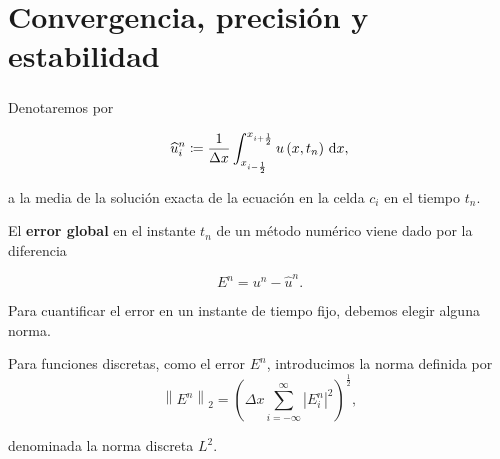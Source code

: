 \section{Convergencia, precisión y estabilidad}

\begin{frame}
    \frametitle{\secname}

    Denotaremos por

    \begin{equation*}
        \widehat{u}^{n}_{i}\coloneqq
        \frac{1}{\Delta x}
        \int_{x_{i-\frac{1}{2}}}^{x_{i+\frac{1}{2}}}
        u\left(x,t_{n}\right)\dl x,
    \end{equation*}

    a la media de la solución exacta de la ecuación en la celda $c_{i}$ en el tiempo $t_{n}$.

    \begin{definition}
        El \textbf{error global} en el instante $t_{n}$ de un método
        numérico viene dado por la diferencia

        \begin{equation*}
            E^{n}=
            u^{n}-
            \widehat{u}^{n}.
        \end{equation*}

        Para cuantificar el error en un instante de tiempo fijo, debemos
        elegir alguna norma.
    \end{definition}

    Para funciones discretas, como el error $E^{n}$, introducimos la
    norma definida por
    \begin{equation}\label{eq:l2normdiscrete}
        {\left\|E^{n}\right\|}_{2}=
            {
                \left(
                \Delta x
                \sum_{i=-\infty}^{\infty}
                {\left|E^{n}_{i}\right|}^{2}
                \right)
            }^{\frac{1}{2}},
    \end{equation}

    denominada la norma discreta $L^{2}$.
\end{frame}

